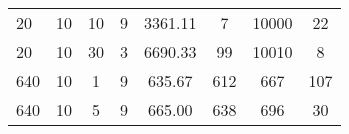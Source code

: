 \begin{table}[H]
\begin{tabular}{l|ccccccc}
 20                                                                   & 10                                                                                                                                                             & 10                                                                                                                               & 9                                                                                                                                                              & 3361.11                                                                                                                          & 7                            & 10000                        & 22                                                                   \\
 20                                                                   & 10                                                                                                                                                             & 30                                                                                                                               & 3                                                                                                                                                              & 6690.33                                                                                                                          & 99                           & 10010                        & 8                                                                    \\
 640                                                                  & 10                                                                                                                                                             & 1                                                                                                                                & 9                                                                                                                                                              & 635.67                                                                                                                           & 612                          & 667                          & 107                                                                  \\
 640                                                                  & 10                                                                                                                                                             & 5                                                                                                                                & 9                                                                                                                                                              & 665.00                                                                                                                           & 638                          & 696                          & 30                                                                   \\

\end{tabular}
\end{table}

